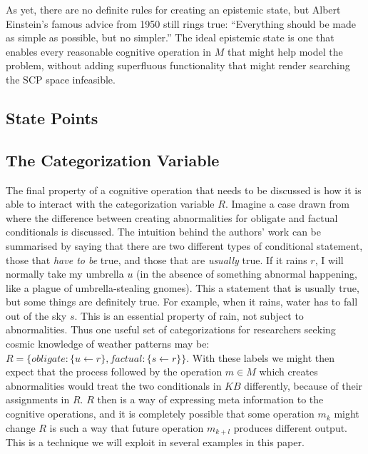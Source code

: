 As yet, there are no definite rules for creating an epistemic state, but Albert Einstein's famous advice from 1950 still rings true: ``Everything should be made as simple as possible, but no simpler.'' The ideal epistemic state is one that enables every reasonable cognitive operation in $M$ that might help model the problem, without adding superfluous functionality that might render searching the SCP space infeasible.

\subsection{State Points}

\subsection{The Categorization Variable}
The final property of a cognitive operation that needs to be discussed is how it is able to interact with the categorization variable $R$. Imagine a case drawn from \cite{saldanha2017weak} where the difference between creating abnormalities for obligate and factual conditionals is discussed. The intuition behind the authors' work can be summarised by saying that there are two different types of conditional statement, those that \textit{have to be} true, and those that are \textit{usually} true. If it rains $r$, I will normally take my umbrella $u$ (in the absence of something abnormal happening, like a plague of umbrella-stealing gnomes). This a statement that is usually true, but some things are definitely true. For example, when it rains, water has to fall out of the sky $s$. This is an essential property of rain, not subject to abnormalities. Thus one useful set of categorizations for researchers seeking cosmic knowledge of weather patterns may be: $R=\{obligate: \{u \leftarrow r\}, factual: \{s \leftarrow r\} \}$. With these labels we might then expect that the process followed by the operation $m \in M$ which creates abnormalities would treat the two conditionals in $KB$ differently, because of their assignments in $R$. $R$ then is a way of expressing meta information to the cognitive operations, and it is completely possible that some operation $m_k$ might change $R$ is such a way that future operation $m_{k+l}$ produces different output. This is a technique we will exploit in several examples in this paper.

